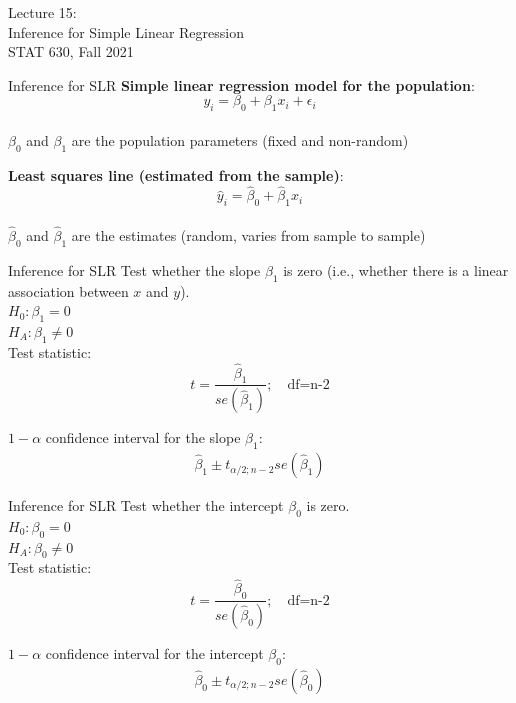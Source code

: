 \documentclass[10pt]{beamer}
\begin{document}
\begin{frame}
\large Lecture 15:\\ 
Inference for Simple Linear Regression\\
STAT 630, Fall 2021
\end{frame}

\begin{frame}{Inference for SLR}
\vspace{-2cm}
\textbf{Simple linear regression model for the population}:\\
$$ y_i = \beta_0 + \beta_1 x_i + \epsilon_i $$\\
$\beta_0$ and $\beta_1$ are the population parameters (fixed and non-random)
\vspace{15pt}

\textbf{Least squares line (estimated from the sample)}:\\
$$ \hat{y}_i = \hat{\beta}_0 + \hat{\beta}_1 x_i $$\\
$\hat{\beta}_0$ and $\hat{\beta}_1$ are the estimates (random, varies from sample to sample)
\end{frame}

\begin{frame}{Inference for SLR}
Test whether the slope $\beta_1$ is zero (i.e., whether there is a linear association between $x$ and $y$).\\
\vspace{10pt}
$H_0: \beta_1 = 0$\\
$H_A: \beta_1 \neq 0$\\
\vspace{10pt}
Test statistic:
$$t = \frac{\hat{\beta}_1}{se(\hat{\beta}_1)}; \quad \text{df=n-2}$$
\vspace{15pt}

$1-\alpha$ confidence interval for the slope $\beta_1$:
\begin{align*}
\hat{\beta}_1 \pm t_{\alpha/2; n-2} se(\hat{\beta}_1)
\end{align*}
\end{frame}


\begin{frame}{Inference for SLR}
Test whether the intercept $\beta_0$ is zero.\\
\vspace{10pt}
$H_0: \beta_0 = 0$\\
$H_A: \beta_0 \neq 0$\\
\vspace{10pt}
Test statistic:
$$t = \frac{\hat{\beta}_0}{se(\hat{\beta}_0)}; \quad \text{df=n-2}$$
\vspace{15pt}

$1-\alpha$ confidence interval for the intercept $\beta_0$:
\begin{align*}
\hat{\beta}_0 \pm t_{\alpha/2; n-2} se(\hat{\beta}_0)
\end{align*}
\end{frame}
\end{document}
